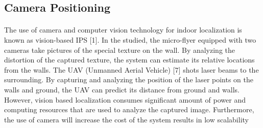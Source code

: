 \subsection{Camera Positioning}
\paragraph{} The use of camera and computer vision technology for indoor localization is known as vision-based IPS [1]. In the studied, the micro-flyer equipped with two cameras take pictures of the special texture on the wall. By analyzing the distortion of the captured texture, the system can estimate its relative locations from the walls. The UAV (Unmanned Aerial Vehicle) [7] shots laser beams to the surrounding. By capturing and analyzing the position of the laser points on the walls and ground, the UAV can predict its distance from ground and walls. However, vision based localization consumes significant amount of power and computing resources that are used to analyze the captured image. Furthermore, the use of camera will increase the cost of the system results in low scalability
    
